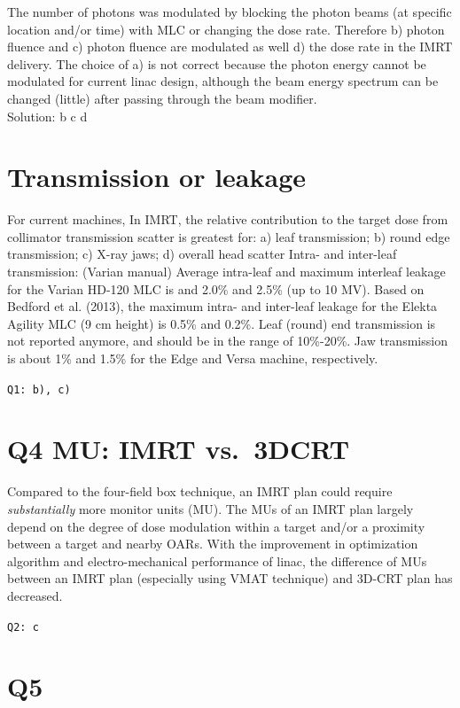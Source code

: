 \documentclass[]{book}
\theoremstyle{definition}
\theoremstyle{definition}
\theoremstyle{definition}
\theoremstyle{remark}
\begin{document}
The number of photons was modulated by blocking the photon beams (at
specific location and/or time) with MLC or changing the dose rate.
Therefore b) photon fluence and c) photon fluence are modulated as well
d) the dose rate in the IMRT delivery. The choice of a) is not correct
because the photon energy cannot be modulated for current linac design,
although the beam energy spectrum can be changed (little) after passing
through the beam modifier.\\
Solution: b c d

\section{Transmission or leakage}\label{transmission-or-leakage}

For current machines, In IMRT, the relative contribution to the target
dose from collimator transmission scatter is greatest for: a) leaf
transmission; b) round edge transmission; c) X-ray jaws; d) overall head
scatter Intra- and inter-leaf transmission: (Varian manual) Average
intra-leaf and maximum interleaf leakage for the Varian HD-120 MLC is
and 2.0\% and 2.5\% (up to 10 MV). Based on Bedford et al. (2013), the
maximum intra- and inter-leaf leakage for the Elekta Agility MLC (9 cm
height) is 0.5\% and 0.2\%. Leaf (round) end transmission is not
reported anymore, and should be in the range of 10\%-20\%. Jaw
transmission is about 1\% and 1.5\% for the Edge and Versa machine,
respectively.

\texttt{Q1:\ b),\ c)}

\section{Q4 MU: IMRT vs.~3DCRT}\label{q4-mu-imrt-vs.3dcrt}

Compared to the four-field box technique, an IMRT plan could require
\emph{substantially} more monitor units (MU). The MUs of an IMRT plan
largely depend on the degree of dose modulation within a target and/or a
proximity between a target and nearby OARs. With the improvement in
optimization algorithm and electro-mechanical performance of linac, the
difference of MUs between an IMRT plan (especially using VMAT technique)
and 3D-CRT plan has decreased.

\texttt{Q2:\ c}

\section{Q5}\label{q5}
\end{document}
